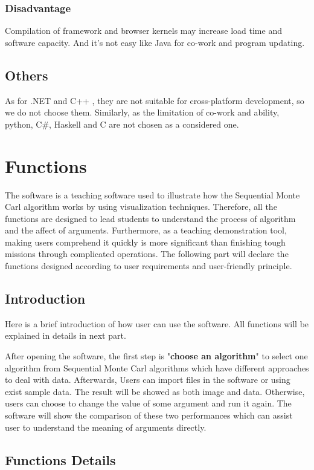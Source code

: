\documentclass[11pt,oneside,a4paper]{article}
\begin{document}
\subsubsection{Disadvantage}
Compilation of framework and browser kernels may increase load time and software capacity. And it’s not easy like Java for co-work and program updating.
\subsection{Others}
As for .NET and C++ , they are not suitable for cross-platform development, so we do not choose them. Similarly, as the limitation of co-work and ability, python, C#, Haskell and C are not chosen as a considered one.

\vspace{20}
\section{Functions}
The software is a teaching software used to illustrate how the Sequential Monte Carl algorithm works by using visualization techniques. Therefore, all the functions are designed to lead students to understand the process of  algorithm and the affect of arguments. Furthermore, as a teaching demonstration tool, making users comprehend it quickly is more significant than finishing tough missions through complicated operations. The following part will declare the functions designed according to user requirements and user-friendly principle.
    \subsection{Introduction}
     Here is a brief introduction of how user can use the software. All functions will be explained in details in next part.

     After opening the software, the first step is "\textbf{choose an algorithm}" to select one algorithm from Sequential Monte Carl algorithms which have different approaches to deal with data.%
     Afterwards, Users can import files in the software or using exist sample data. The result will be showed as both image and data. Otherwise, users can choose to change the value of some argument and run it again. The software will show the comparison of these two performances which can assist user to understand the meaning of arguments directly.

    \subsection{Functions Details}
\end{document}
